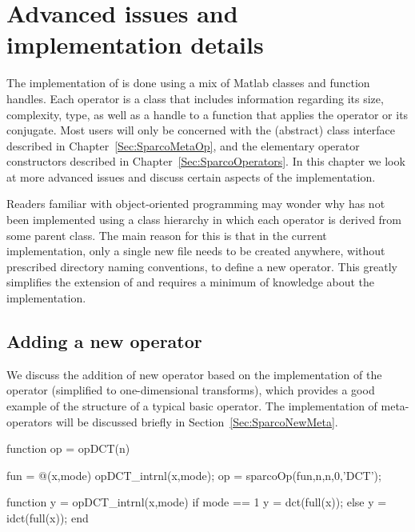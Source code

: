 \chapter[Advanced issues]{Advanced issues and implementation details}
\label{Sec:SparcoImplementation}

The implementation of \spot{} is done using a mix of Matlab classes
and function handles. Each operator is a class that includes
information regarding its size, complexity, type, as well as a handle
to a function that applies the operator or its conjugate. Most users
will only be concerned with the (abstract) class interface described
in Chapter~\ref{Sec:SparcoMetaOp}, and the elementary operator
constructors described in Chapter~\ref{Sec:SparcoOperators}.  In this
chapter we look at more advanced issues and discuss certain aspects of
the implementation.

Readers familiar with object-oriented programming may wonder why
\spot{} has not been implemented using a class hierarchy in which each
operator is derived from some parent class. The main reason for this
is that in the current implementation, only a single new file needs to
be created anywhere, without prescribed directory naming conventions,
to define a new operator. This greatly simplifies the extension of
\spot{} and requires a minimum of knowledge about the implementation.

\section{Adding a new operator}

We discuss the addition of new operator based on the implementation of
the  operator (simplified to one-dimensional transforms),
which provides a good example of the structure of a typical basic
operator. The implementation of meta-operators will be discussed
briefly in Section~\ref{Sec:SparcoNewMeta}.

\begin{codeblock}
function op = opDCT(n)
%
%

fun = @(x,mode) opDCT_intrnl(x,mode);
op  = sparcoOp(fun,n,n,0,'DCT');


function y = opDCT_intrnl(x,mode)
if mode == 1
   y = dct(full(x));
else
   y = idct(full(x));
end
\end{codeblock}

